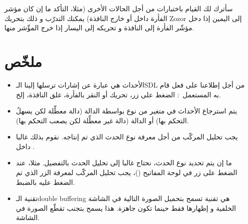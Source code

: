 سأترك لك القيام باختبارات من أجل الحالات الأخرى (مثلا، التأكد ما إن كان مؤشر الفأرة داخل أو خارج النافذة) يمكنك التدرّب و ذلك بتحريك
\textenglish{Zozor}
إلى اليمين إذا دخل مؤشّر الفأرة إلى النافذة و تحريكه إلى اليسار إذا خرج المؤّشر منها.

\section*{ملخّص}

\begin{itemize}
	\item الأحداث هي عبارة عن إشارات ترسلها إلينا الـ\textenglish{SDL}
	من أجل إطلاعنا على فعل قام به المستعمل~: الضغط على زر، تحريك أو النقر بالفأرة، غلق النافذة، إلخ.
	\item يتم استرجاع الأحداث في متغير من نوع
	بواسطة الدالة
	(دالة معطِّلة لكن يسهلُ التحكم بها) أو الدالة 
	(دالة غير معطِّلة لكن يصعب التحكم بها).
	\item يجب تحليل المركّب
	من أجل معرفة نوع الحدث الذي تم إنتاجه. نقوم بذلك غالبا داخل 
	.
	\item ما إن يتم تحديد نوع الحدث، نحتاج غالبا إلى تحليل الحدث بالتفصيل. مثلا، عند الضغط على زر في لوحة المفاتيح
	()،
	يجب تحليل المركّب
	لمعرفة الزر الذي تم الضغط عليه بالضبط.
	\item تقنية الـ\textenglish{double buffering}
	هي تقنية تسمح بتحميل الصورة التالية في الشاشة الخلفية و إظهارها فقط حينما تكون جاهزة. هذا يسمح بتجنب تقطّع الصورة في الشاشة.
\end{itemize}

